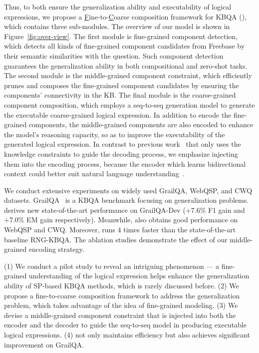 Thus, to both ensure the generalization ability and executability of logical expressions, we propose a \underline{F}ine-to-\underline{C}oarse composition framework for KBQA (\model), which contains three sub-modules. The overview of our model is shown in Figure~\ref{fig:over-view}.
The first module is fine-grained component detection, which detects all kinds of fine-grained component candidates from Freebase by their semantic similarities with the question. Such component detection guarantees the generalization ability in both compositional and zero-shot tasks. The second module is the middle-grained component constraint, which efficiently prunes and composes the fine-grained component candidates by ensuring the components' connectivity in the KB. %
The final module is the coarse-grained component composition, which employs a seq-to-seq generation model to generate the executable coarse-grained logical expression. In addition to encode the fine-grained components, the middle-grained components are also encoded to enhance the model's reasoning capacity, so as to improve the executability of the generated logical expression. In contrast to previous work~\cite{cao-etal-2022-program,chen-etal-2021-retrack,shu2022tiara} that only uses the knowledge constraints to guide the decoding process, we emphasize injecting them into the encoding process, because the encoder which learns bidirectional context could better suit natural language understanding~\cite{du2022glm}.

We conduct extensive experiments on widely used GrailQA, WebQSP, and CWQ datasets. GrailQA~\cite{gu2021beyond} is a KBQA benchmark focusing on generalization problems. \smodel derives new state-of-the-art performance on GrailQA-Dev (+7.6\% F1 gain and +7.0\% EM gain respectively). Meanwhile, \smodel also obtains good performance on WebQSP and CWQ. Moreover, \smodel runs 4 times faster than the state-of-the-art baseline RNG-KBQA. The ablation studies demonstrate the effect of our middle-grained encoding strategy.

(1) We conduct a pilot study to reveal an intriguing phenomenon --- a fine-grained understanding of the logical expression helps enhance the generalization ability of SP-based KBQA methods, which is rarely discussed before.
(2) We propose a fine-to-coarse composition framework \smodel to address the generalization problem, which takes advantage of the idea of fine-grained modeling.
(3) We devise a middle-grained component constraint that is injected into both the encoder and the decoder to guide the seq-to-seq model in producing executable logical expressions.
(4) \smodel not only maintains efficiency but also achieves significant improvement on GrailQA.